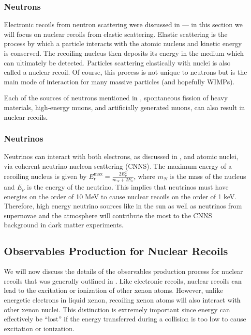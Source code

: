 \subsubsection{Neutrons}

Electronic recoils from neutron scattering were discussed in  --- in this section we will focus on nuclear recoils from elastic scattering.  Elastic scattering is the process by which a particle interacts with the atomic nucleus and kinetic energy is conserved.  The recoiling nucleus then deposits its energy in the medium which can ultimately be detected.  Particles scattering elastically with nuclei is also called a nuclear recoil.  Of course, this process is not unique to neutrons but is the main mode of interaction for many massive particles (and hopefully WIMPs).  

Each of the sources of neutrons mentioned in , spontaneous fission of heavy materials, high-energy muons, and artificially generated muons, can also result in nuclear recoils.




\subsubsection{Neutrinos}

Neutrinos can interact with both electrons, as discussed in , and atomic nuclei, via coherent neutrino-nucleon scattering (CNNS).  The maximum energy of a recoiling nucleus is given by $E_{\textrm{r}}^{\textrm{max}} = \frac{2 E_{\nu}^2}{m_N + 2 E_{\nu}}$, where $m_N$ is the mass of the nucleus and $E_{\nu}$ is the energy of the neutrino.  This implies that neutrinos must have energies on the order of 10 MeV to cause nuclear recoils on the order of 1 keV.  Therefore, high energy neutrino sources like  in the sun as well as neutrinos from supernovae and the atmosphere will contribute the most to the CNNS background in dark matter experiments.


\subsection{Observables Production for Nuclear Recoils}
\label{sec:xe_nr_observables}

We will now discuss the details of the observables production process for nuclear recoils that was generally outlined in .  Like electronic recoils, nuclear recoils can lead to the excitation or ionization of other xenon atoms.  However, unlike energetic electrons in liquid xenon, recoiling xenon atoms will also interact with other xenon nuclei.  This distinction is extremely important since energy can effectively be ``lost'' if the energy transferred during a collision is too low to cause excitation or ionization.  

